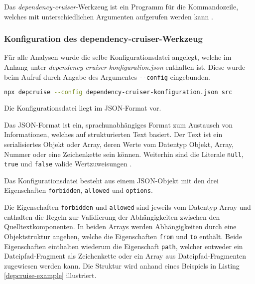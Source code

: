 Das \emph{dependency-cruiser}-Werkzeug ist ein Programm für die Kommandozeile, welches mit unterschiedlichen Argumenten aufgerufen werden kann \autocite[vgl.][]{Verweij:CLI}.

\subsubsection{Konfiguration des {dependency-cruiser}-Werkzeug}
Für alle Analysen wurde die selbe Konfigurationsdatei angelegt, welche im Anhang unter \emph{dependency-cruiser-konfiguration.json} enthalten ist. Diese wurde beim Aufruf durch Angabe des Argumentes \lstinline|--config| eingebunden.
\begin{lstlisting}[language={sh},label=depcruise-config, caption=Aufruf des \emph{dependency-cruiser} mit eingebundener Konfigurationsdatei]
    npx depcruise --config dependency-cruiser-konfiguration.json src
\end{lstlisting}
Die Konfigurationsdatei liegt im JSON-Format vor. 

Das JSON-Format ist ein, sprachunabhängiges Format zum Austausch von Informationen, welches auf strukturierten Text basiert. Der Text ist ein serialisiertes Objekt oder Array, deren Werte vom Datentyp Objekt, Array, Nummer oder eine Zeichenkette sein können. Weiterhin sind die Literale \lstinline|null|, \lstinline|true| und \lstinline|false| valide Wertzuweisungen \autocite[vgl.][]{JSON:Einführung}.  

Das Konfigurationsdatei besteht aus einem JSON-Objekt mit den drei Eigenschaften \lstinline|forbidden|, \lstinline|allowed| und \lstinline|options|.

Die Eigenschaften \lstinline|forbidden| und \lstinline|allowed| sind jeweils vom Datentyp Array und enthalten die Regeln zur Validierung der Abhängigkeiten zwischen den Quelltextkomponenten. 
In beiden Arrays werden Abhängigkeiten durch eine Objektstruktur angeben, welche die Eigenschaften \lstinline|from| und \lstinline|to| enthält. Beide Eigenschaften einthalten wiederum die Eigenschaft \lstinline|path|, welcher entweder ein Dateipfad-Fragment als Zeichenkette oder ein Array aus Dateipfad-Fragmenten zugewiesen werden kann. Die Struktur wird anhand eines Beispiels in Listing \ref{depcruise-example} illustriert.

